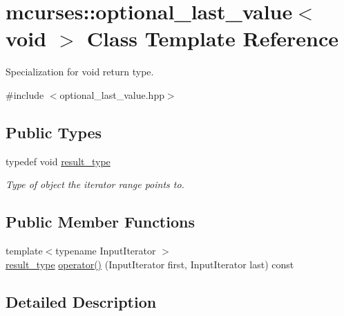 \hypertarget{classmcurses_1_1optional__last__value_3_01void_01_4}{}\section{mcurses\+:\+:optional\+\_\+last\+\_\+value$<$ void $>$ Class Template Reference}
\label{classmcurses_1_1optional__last__value_3_01void_01_4}


Specialization for void return type.  




{\ttfamily \#include $<$optional\+\_\+last\+\_\+value.\+hpp$>$}

\subsection*{Public Types}
\begin{DoxyCompactItemize}
\item 
\hypertarget{classmcurses_1_1optional__last__value_3_01void_01_4_a0b16df56f492da881527bff6c6da74cd}{}\label{classmcurses_1_1optional__last__value_3_01void_01_4_a0b16df56f492da881527bff6c6da74cd} 
typedef void \hyperlink{classmcurses_1_1optional__last__value_3_01void_01_4_a0b16df56f492da881527bff6c6da74cd}{result\+\_\+type}
\begin{DoxyCompactList}\small\item\em Type of object the iterator range points to. \end{DoxyCompactList}\end{DoxyCompactItemize}
\subsection*{Public Member Functions}
\begin{DoxyCompactItemize}
\item 
{\footnotesize template$<$typename Input\+Iterator $>$ }\\\hyperlink{classmcurses_1_1optional__last__value_3_01void_01_4_a0b16df56f492da881527bff6c6da74cd}{result\+\_\+type} \hyperlink{classmcurses_1_1optional__last__value_3_01void_01_4_af07a5836fc2c1556b262cb9a4920370c}{operator()} (Input\+Iterator first, Input\+Iterator last) const
\end{DoxyCompactItemize}


\subsection{Detailed Description}
